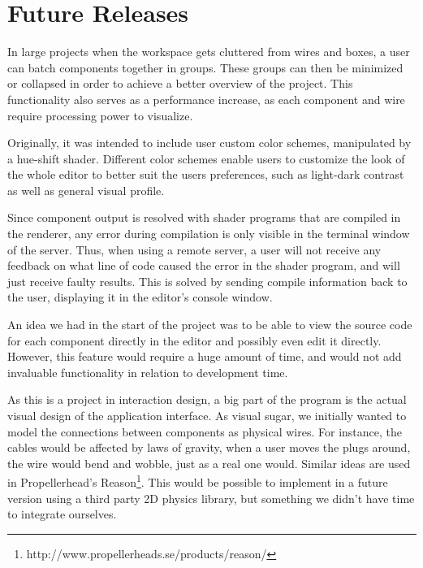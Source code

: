 \section{Future Releases}

In large projects when the workspace gets cluttered from wires and boxes, a user can batch components together in groups. These groups can then be minimized or collapsed in order to achieve a better overview of the project. This functionality also serves as a performance increase, as each component and wire require processing power to visualize. 

Originally, it was intended to include user custom color schemes, manipulated by a hue-shift shader. Different color schemes enable users to customize the look of the whole editor to better suit the users preferences, such as light-dark contrast as well as general visual profile.

Since component output is resolved with shader programs that are compiled in the renderer, any error during compilation is only visible in the terminal window of the server. Thus, when using a remote server, a user will not receive any feedback on what line of code caused the error in the shader program, and will just receive faulty results. This is solved by sending compile information back to the user, displaying it in the editor's console window. 

An idea we had in the start of the project was to be able to view the source code for each component directly in the editor and possibly even edit it directly. However, this feature would require a huge amount of time, and would not add invaluable functionality in relation to development time. 


As this is a project in interaction design, a big part of the program is the actual visual design of the application interface. As visual sugar, we initially wanted to model the connections between components as physical wires. For instance, the cables would be affected by laws of gravity, when a user moves the plugs around, the wire would bend and wobble, just as a real one would. Similar ideas are used in Propellerhead's Reason\footnote{http://www.propellerheads.se/products/reason/}. This would be possible to implement in a future version using a third party 2D physics library, but something we didn't have time to integrate ourselves.

